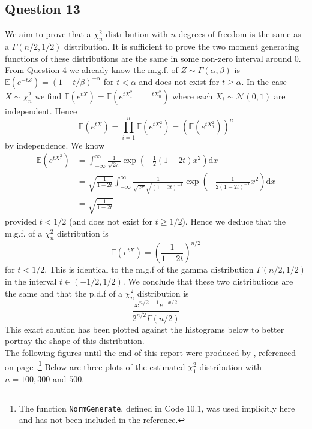 \documentclass[10pt,a4paper,notitlepage]{article}
\newcommand{\Nd}{\mathcal{N}}
\newcommand{\E}[1]{\mathbb{E}\left(#1\right)}
\begin{document}
\subsection*{\centering Question 13}
We aim to prove that a $\chi_{n}^{2}$ distribution with $n$ degrees of freedom is the same as a $\Gamma\left(n/2,1/2\right)$ distribution. It is sufficient to prove the two moment generating functions of these distributions are the same in some non-zero interval around 0. From Question 4 we already know the m.g.f. of $Z\sim\Gamma\left(\alpha,\beta\right)$ is $\E{e^{-tZ}}=(1-t/\beta)^{-\alpha}$ for $t < \alpha$ and does not exist for $t\geq\alpha$. In the case $X\sim\chi_{n}^{2}$ we find $\E{e^{tX}}=\E{e^{tX_{1}^{2}+\hdots+tX_{n}^{2}}}$ where each $X_{i}\sim \Nd(0,1)$ are independent. Hence
\begin{equation}
\E{e^{tX}}=\prod_{i=1}^{n}\E{e^{tX_{i}^{2}}}=\left(\E{e^{tX_{1}^{2}}}\right)^{n}
\end{equation}
by independence. We know
\begin{equation}
\begin{aligned}
\E{e^{tX_{1}^{2}}} &=\int_{-\infty}^{\infty}\frac{1}{\sqrt{2\pi}}\exp\left(-\frac{1}{2}\left(1-2t\right)x^{2}\right)\mathrm{d}x\\
&= \sqrt{\frac{1}{1-2t}}\int_{-\infty}^{\infty}\frac{1}{\sqrt{2\pi}\sqrt{\left(1-2t\right)^{-1}}}\exp\left(-\frac{1}{2\left(1-2t\right)^{-1}}x^{2}\right)\mathrm{d}x\\
&=\sqrt{\frac{1}{1-2t}}
\end{aligned}
\end{equation}
provided $t<1/2$ (and does not exist for $t\geq 1/2$). Hence we deduce that the m.g.f. of a $\chi_{n}^{2}$ distribution is
\begin{equation}
\E{e^{tX}}=\left(\frac{1}{1-2t}\right)^{n/2}
\end{equation}
for $t<1/2$. This is identical to the m.g.f of the gamma distribution $\Gamma\left(n/2,1/2\right)$ in the interval $t\in(-1/2,1/2)$. We  conclude that these two distributions are the same and that the p.d.f of a $\chi_{n}^{2}$ distribution is
\begin{equation}\label{eq:PDF13}
\frac{x^{n/2-1}e^{-x/2}}{2^{n/2}\Gamma\left(n/2\right)}
\end{equation}
This exact solution has been plotted against the histograms below to better portray the shape of this distribution.\\
The following figures until the end of this report were produced by , referenced on page \pageref{cd:13.1}.\footnote{The function \texttt{NormGenerate}, defined in Code 10.1, was used implicitly here and has not been included in the reference.} Below are three plots of the estimated $\chi_{1}^{2}$ distribution with $n=100,300$ and $500$. 
\end{document}

